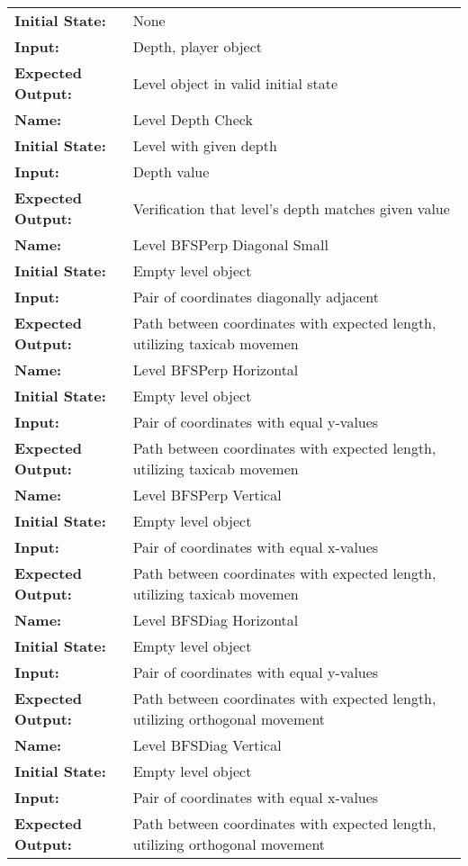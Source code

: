 \documentclass[12pt, titlepage]{article}
\begin{document}
\begin{center}
\begin{longtable}{ l | l }
\textbf{Initial State:} & None\\
\textbf{Input:} & Depth, player object\\
\textbf{Expected Output:} & Level object in valid initial state\\
\hline
\textbf{Name:} & Level Depth Check\\
\textbf{Initial State:} & Level with given depth\\
\textbf{Input:} & Depth value\\
\textbf{Expected Output:} & Verification that level's depth matches given value\\
\hline
\textbf{Name:} & Level BFSPerp Diagonal Small\\
\textbf{Initial State:} & Empty level object\\
\textbf{Input:} & Pair of coordinates diagonally adjacent\\
\textbf{Expected Output:} & Path between coordinates with expected length, utilizing taxicab movemen\\
\hline
\textbf{Name:} & Level BFSPerp Horizontal\\
\textbf{Initial State:} & Empty level object\\
\textbf{Input:} & Pair of coordinates with equal y-values\\
\textbf{Expected Output:} & Path between coordinates with expected length, utilizing taxicab movemen\\
\hline
\textbf{Name:} & Level BFSPerp Vertical\\
\textbf{Initial State:} & Empty level object\\
\textbf{Input:} & Pair of coordinates with equal x-values\\
\textbf{Expected Output:} & Path between coordinates with expected length, utilizing taxicab movemen\\
\hline
\textbf{Name:} & Level BFSDiag Horizontal\\
\textbf{Initial State:} & Empty level object\\
\textbf{Input:} & Pair of coordinates with equal y-values\\
\textbf{Expected Output:} & Path between coordinates with expected length, utilizing orthogonal movement\\
\hline
\textbf{Name:} & Level BFSDiag Vertical\\
\textbf{Initial State:} & Empty level object\\
\textbf{Input:} & Pair of coordinates with equal x-values\\
\textbf{Expected Output:} & Path between coordinates with expected length, utilizing orthogonal movement\\

\end{longtable}
\end{center}
\end{document}
